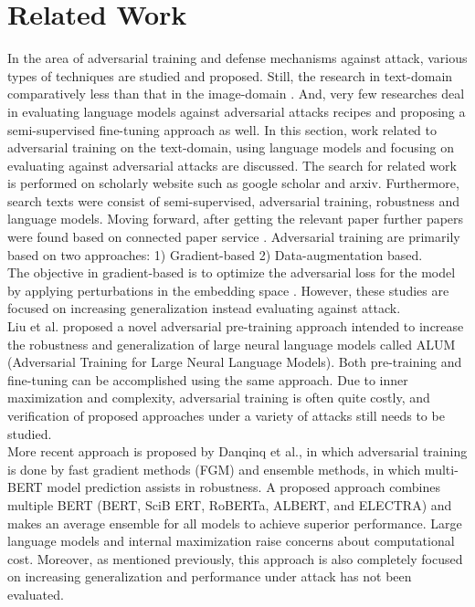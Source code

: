 \documentclass[%
	BCOR=8mm, %
	DIV=12,
	toc=bibliography, %
	toc=listof, %
	oneside, %
	egregdoesnotlikesansseriftitles, %
	]{scrbook}
\begin{document}
\chapter{Related Work}
\label{chapter:relatedwork}
In the area of adversarial training and defense mechanisms against attack, various types of techniques are studied and proposed. Still, the research in text-domain comparatively less than that in the image-domain \cite{wang_towards_2021}. And, very few researches deal in evaluating language models against adversarial attacks recipes and proposing a semi-supervised fine-tuning approach as well. In this section, work related to adversarial training on the text-domain, using language models and focusing on evaluating against adversarial attacks are discussed.  The search for related work is performed on scholarly website such as google scholar and arxiv. Furthermore, search texts were consist of semi-supervised, adversarial training, robustness and language models. Moving forward,  after getting the relevant paper further papers were found based on connected paper service \cite{noauthor_connected_nodate-1}.
Adversarial training are primarily based on two approaches: 1) Gradient-based 2) Data-augmentation based. \\
The objective in gradient-based  is to optimize the adversarial loss for the model by applying perturbations in the embedding space \cite{liu_adversarial_2020,goodfellow_explaining_2015,zhu_at-bert_2021,miyato_adversarial_2017,jiang_smart_2020-1}.  However, these studies are focused on increasing generalization instead evaluating against attack.\\
 Liu et al.\cite{liu_adversarial_2020} proposed a novel adversarial pre-training approach intended to increase the robustness and generalization of large neural language models called ALUM (Adversarial Training for Large Neural Language Models). Both pre-training and fine-tuning can be accomplished using the same approach. Due to inner maximization and complexity, adversarial training is often quite costly, and verification of proposed approaches under a variety of attacks still needs to be studied.\\
More recent approach is proposed by Danqinq et al.\cite{zhu_at-bert_2021}, in which adversarial training is done by fast gradient methods (FGM) \cite{miyato_adversarial_2017} and ensemble methods, in which multi-BERT model prediction assists in robustness. A proposed approach combines multiple BERT (BERT, SciB ERT, RoBERTa, ALBERT, and ELECTRA) and makes an average ensemble for all models to achieve superior performance. Large language models and internal maximization raise concerns about computational cost. Moreover, as mentioned previously, this approach is also completely focused on increasing generalization and performance under attack has not been evaluated.\\
\end{document}
